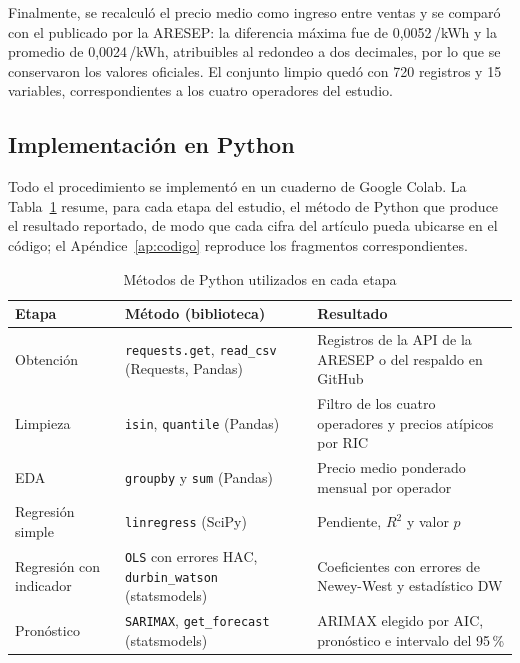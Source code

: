 \documentclass[conference]{IEEEtran}
\newcommand{\crc}{\textcolonmonetary} %
\begin{document}
Finalmente, se recalcul\'o el precio medio como ingreso entre ventas y se compar\'o con el publicado por la ARESEP: la diferencia m\'axima fue de 0,0052\,\crc/kWh y la promedio de 0,0024\,\crc/kWh, atribuibles al redondeo a dos decimales, por lo que se conservaron los valores oficiales. El conjunto limpio qued\'o con 720 registros y 15 variables, correspondientes a los cuatro operadores del estudio.
\subsection{Implementaci\'on en Python}
\label{sec:implementacion}

Todo el procedimiento se implement\'o en un cuaderno de Google Colab. La Tabla~\ref{tab:metodos} resume, para cada etapa del estudio, el m\'etodo de Python que produce el resultado reportado, de modo que cada cifra del art\'iculo pueda ubicarse en el c\'odigo; el Ap\'endice~\ref{ap:codigo} reproduce los fragmentos correspondientes.

\begin{table}[htbp]
\caption{M\'etodos de Python utilizados en cada etapa}
\label{tab:metodos}
\centering
\scriptsize
\renewcommand{\arraystretch}{1.15}
\begin{tabular}{@{}>{\raggedright\arraybackslash}p{1.45cm} >{\raggedright\arraybackslash}p{2.9cm} >{\raggedright\arraybackslash}p{3.3cm}@{}}
\hline
\textbf{Etapa} & \textbf{M\'etodo (biblioteca)} & \textbf{Resultado} \\
\hline
Obtenci\'on & \texttt{requests.get}, \texttt{read\_csv} (Requests, Pandas) & Registros de la API de la ARESEP o del respaldo en GitHub \\
Limpieza & \texttt{isin}, \texttt{quantile} (Pandas) & Filtro de los cuatro operadores y precios at\'ipicos por RIC \\
EDA & \texttt{groupby} y \texttt{sum} (Pandas) & Precio medio ponderado mensual por operador \\
Regresi\'on simple & \texttt{linregress} (SciPy) & Pendiente, $R^2$ y valor $p$ \\
Regresi\'on con indicador & \texttt{OLS} con errores HAC, \texttt{durbin\_watson} (statsmodels) & Coeficientes con errores de Newey-West y estad\'istico DW \\
Pron\'ostico & \texttt{SARIMAX}, \texttt{get\_forecast} (statsmodels) & ARIMAX elegido por AIC, pron\'ostico e intervalo del 95\,\% \\
\hline
\end{tabular}
\end{table}
\end{document}

